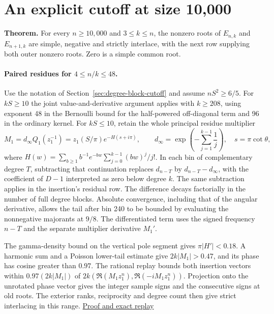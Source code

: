 \section{An explicit cutoff at size 10,000}
\label{sec:paired-fourier-cutoff}

\textbf{Theorem.} For every \(n\ge10{,}000\) and \(3\le k\le n\), the
nonzero roots of \(E_{n,k}\) and \(E_{n+1,k}\) are simple, negative and
strictly interlace, with the next row supplying both outer nonzero roots.
Zero is a simple common root.

\paragraph{Paired residues for \(4\le n/k\le48\).}
Use the notation of Section~\ref{sec:degree-block-cutoff} and assume
\(nS^2\ge6/5\). For \(kS\ge10\) the joint value-and-derivative argument
applies with \(k\ge208\), using exponent 48 in the Bernoulli bound for
the half-powered off-diagonal term and 96 in the ordinary kernel.
For \(kS\le10\), retain the whole principal residue multiplier
\[
 M_1=d_\infty Q_1(z_1^{-1})
     =z_1(S/\pi)e^{-H(s+i\pi)},\qquad
 d_\infty=\exp\!\left(-\sum_{j=1}^{k-1}\frac1j\right),\quad
 s=\pi\cot\theta ,
\]
where \(H(w)=\sum_{b\ge1}b^{-1}e^{-bw}\sum_{j=0}^{k-1}(bw)^j/j!\).
In each bin of complementary degree \(T\), subtracting that
continuation replaces \(d_{n-T}\) by \(d_{n-T}-d_\infty\),
with the coefficient of \(D-1\) interpreted as zero below degree
\(k\). The same subtraction applies in the insertion's residual row.
The difference decays factorially in the number of full degree blocks.
Absolute convergence, including that of the angular derivative, allows
the tail after bin 240 to be bounded by evaluating the nonnegative
majorants at \(9/8\). The differentiated term uses the signed
frequency \(n-T\) and the separate multiplier derivative \(M_1'\).

The gamma-density bound on the vertical pole segment gives
\(\pi|H'|<0.18\). A harmonic sum and a Poisson lower-tail estimate
give \(2k|M_1|>0.47\), and its phase has cosine greater than \(0.97\).
The rational replay bounds both insertion vectors within
\(0.97(2k|M_1|)\) of
\(2k(\Re(M_1 z_1^n),\Re(-iM_1 z_1^n))\). Projection onto the
unrotated phase vector gives the integer sample signs and the
consecutive signs at old roots. The exterior ranks, reciprocity and
degree count then give strict interlacing in this range.
\href{https://github.com/ProgramComputer/open-math-research/tree/main/topics/long-cycle-excedances/paired-residues}{Proof and exact replay}

